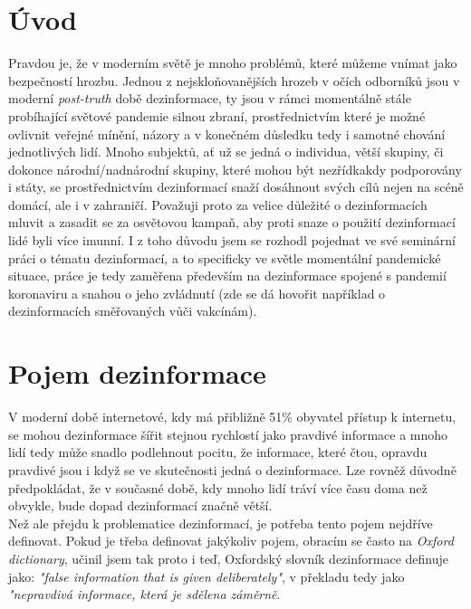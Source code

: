 \section*{Úvod}
Pravdou je, že v moderním světě je mnoho problémů, které můžeme vnímat jako bezpečností hrozbu. Jednou z nejskloňovanějších hrozeb v očích odborníků jsou v moderní \textit{post-truth} době dezinformace, ty jsou v rámci momentálně stále probíhající světové pandemie silnou zbraní, prostřednictvím které je možné ovlivnit veřejné mínění, názory a v konečném důsledku tedy i samotné chování jednotlivých lidí. Mnoho subjektů, ať už se jedná o individua, větší skupiny, či dokonce národní/nadnárodní skupiny, které mohou být nezřídkakdy podporovány i státy, se prostřednictvím dezinformací snaží dosáhnout svých cílů nejen na scéně domácí, ale i v zahraničí. Považuji proto za velice důležité o dezinformacích mluvit a zasadit se za osvětovou kampaň, aby proti snaze o použití dezinformací lidé byli více imunní. I z toho důvodu jsem se rozhodl pojednat ve své seminární práci o tématu dezinformací, a to specificky ve světle momentální pandemické situace, práce je tedy zaměřena především na dezinformace spojené s pandemií koronaviru a snahou o jeho zvládnutí (zde se dá hovořit například o dezinformacích směřovaných vůči vakcínám).

\section{Pojem dezinformace}

V moderní době internetové, kdy má přibližně 51\% obyvatel přístup k internetu\cite{noauthor_individuals_nodate}, se mohou dezinformace šířit stejnou rychlostí jako pravdivé informace a mnoho lidí tedy může snadlo podlehnout pocitu, že informace, které čtou, opravdu pravdivé jsou i když se ve skutečnosti jedná o dezinformace. Lze rovněž důvodně předpokládat, že v současné době, kdy mnoho lidí tráví více času doma než obvykle, bude dopad dezinformací značně větší.\\

Než ale přejdu k problematice dezinformací, je potřeba tento pojem nejdříve definovat. Pokud je třeba definovat jakýkoliv pojem, obracím se často na \textit{Oxford dictionary}, učinil jsem tak proto i teď, Oxfordský slovník dezinformace definuje jako: \textit{"false information that is given deliberately"}\cite{noauthor_disinformation_nodate}, v překladu tedy jako \textit{"nepravdivá informace, která je sdělena záměrně}.\\

